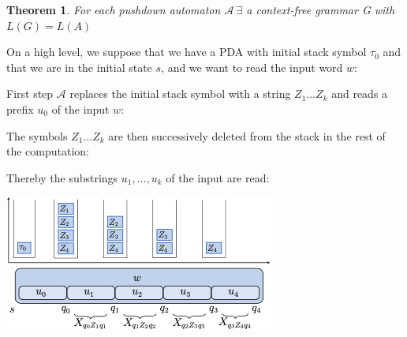 \documentclass[a3paper, 8pt]{extarticle}
\newtheorem{theorem}{Theorem}[section]
\begin{document}
\begin{multicols*}{6}



\begin{theorem}
For each pushdown automaton $\mathcal{A} \ \exists$ a context-free grammar G with $L(G)=L(A)$ 
\end{theorem}

On a high level, we suppose that we have a PDA with initial stack symbol $\tau_0$ and that we are in the initial state $s$, and we want to read the input word $w$:

First step $\mathcal{A}$ replaces the initial stack symbol with a string $Z_1 \dots Z_k$ and reads a prefix $u_0$ of the input $w$:


The symbols $Z_1 \dots Z_k$ are then successively deleted from the stack in the rest of the computation:


Thereby the substrings $u_1,\dots ,u_k$ of the input are read:

\includegraphics[width=\columnwidth]{images/Screen Shot 2022-11-10 at 17.00.38.png}


\end{multicols*}
\end{document}

